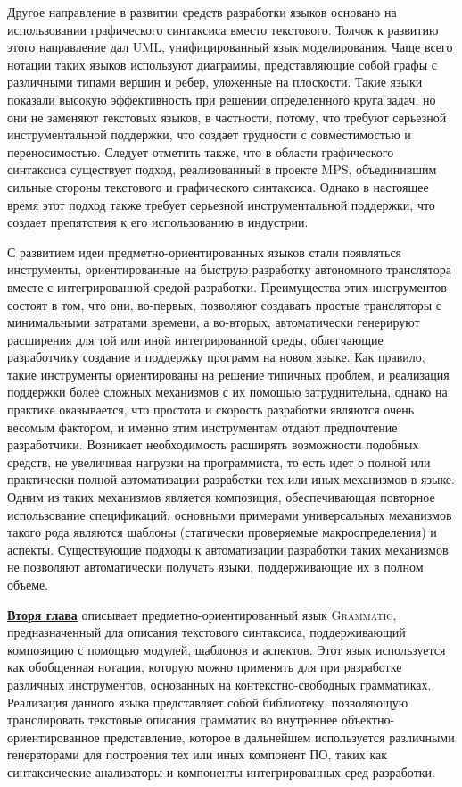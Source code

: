 \documentclass[12pt,a4paper]{article}
\newcommand{\tool}[1]{\textsc{#1}}
\newcommand{\afsubsection}[1]{\par \textbf{\underline{#1}}}
\begin{document}
Другое направление в развитии средств разработки языков основано на использовании графического синтаксиса вместо текстового. Толчок к развитию этого направление дал UML, унифицированный язык моделирования. Чаще всего нотации таких языков используют диаграммы, представляющие собой графы с различными типами вершин и ребер, уложенные на плоскости. Такие языки показали высокую эффективность при решении определенного круга задач, но они не заменяют текстовых языков, в частности, потому, что требуют серьезной инструментальной поддержки, что создает трудности с совместимостью и переносимостью. Следует отметить также, что в области графического синтаксиса существует подход, реализованный в проекте \tool{MPS}, объединившим сильные стороны текстового и графического синтаксиса. Однако в настоящее время этот подход также требует серьезной инструментальной поддержки, что создает препятствия к его использованию в индустрии.

С развитием идеи предметно-ориентированных языков стали появляться инструменты, ориентированные на быструю разработку автономного транслятора вместе с интегрированной средой разработки. Преимущества этих инструментов состоят в том, что они, во-первых, позволяют создавать простые трансляторы с минимальными затратами времени, а во-вторых, автоматически генерируют расширения для той или иной интегрированной среды, облегчающие разработчику создание и поддержку программ на новом языке. Как правило, такие инструменты ориентированы на решение типичных проблем, и реализация поддержки более сложных механизмов с их помощью затруднительна, однако на практике оказывается, что простота и скорость разработки являются очень весомым фактором, и именно этим инструментам отдают предпочтение разработчики. Возникает необходимость расширять возможности подобных средств, не увеличивая нагрузки на программиста, то есть идет о полной или практически полной автоматизации разработки тех или иных механизмов в языке. Одним из таких механизмов является композиция, обеспечивающая повторное использование спецификаций, основными примерами универсальных механизмов такого рода являются шаблоны (статически проверяемые макроопределения) и аспекты. Существующие подходы к автоматизации разработки таких механизмов не позволяют автоматически получать языки, поддерживающие их в полном объеме.

\afsubsection{Вторя глава} описывает предметно-ориентированный язык \tool{Grammatic}, предназначенный для описания текстового синтаксиса, поддерживающий композицию с помощью модулей, шаблонов и аспектов. Этот язык используется как обобщенная нотация, которую можно применять для при разработке различных инструментов, основанных на контекстно-свободных грамматиках. Реализация данного языка представляет собой библиотеку, позволяющую транслировать текстовые описания грамматик во внутреннее объектно-ориентированное представление, которое в дальнейшем используется различными генераторами для построения тех или иных компонент ПО, таких как синтаксические анализаторы и компоненты интегрированных сред разработки.
\end{document}
